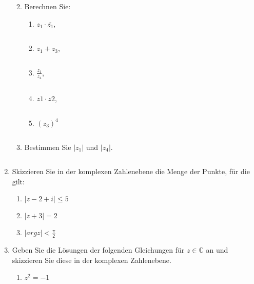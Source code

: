 \documentclass[12pt,a4paper]{scrreprt}
\newcommand{\C}{\mathds{C}}
\begin{document}
\begin{enumerate}
\begin{enumerate}
\begin{tikzpicture}[scale=1]
	

    \end{tikzpicture}

\[
\]

		\item Berechnen Sie:

			\begin{enumerate}
	
\item $z_1 \cdot \overline{z_1}$,

\[
\]

\item $z_1 + z_3$,

\[
\]

\item $\frac{z_1}{z_4}$,

\[
\]

\item $z1 \cdot z2$,

\[
\]

\item $(z_{3})^{4}$

\[
\]

			\end{enumerate}

		\item Bestimmen Sie $|z_1|$ und $|z_4|$.


\[
\]

	\end{enumerate}

	\item Skizzieren Sie in der komplexen Zahlenebene die Menge der Punkte, für die gilt:

	\begin{enumerate}

		\item $|z - 2 + i| \leq 5$


		\item $|z + 3| = 2$


		\item $|arg z| < \frac{\pi}{2}$


	\end{enumerate}

	\item Geben Sie die Lösungen der folgenden Gleichungen für $z \in \C$ an und skizzieren Sie diese in der komplexen Zahlenebene.

	\begin{enumerate}

		\item $z^2=-1$


\end{enumerate}
\end{enumerate}
\end{document}
